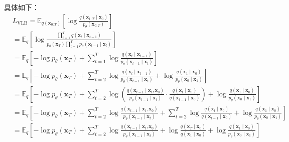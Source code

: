 具体如下：
\begin{equation}
\begin{aligned}
& L_{\mathrm{VLB}}=\mathbb{E}_{q\left(\mathbf{x}_{0: T}\right)}\left[\log \frac{q\left(\mathbf{x}_{1: T} \mid \mathbf{x}_0\right)}{p_\theta\left(\mathbf{x}_{0: T}\right)}\right] \\
& =\mathbb{E}_q\left[\log \frac{\prod_{t=1}^T q\left(\mathbf{x}_t \mid \mathbf{x}_{t-1}\right)}{p_\theta\left(\mathbf{x}_T\right) \prod_{t=1}^T p_\theta\left(\mathbf{x}_{t-1} \mid \mathbf{x}_t\right)}\right] \\
& =\mathbb{E}_q\left[-\log p_\theta\left(\mathbf{x}_T\right)+\sum_{t=1}^T \log \frac{q\left(\mathbf{x}_t \mid \mathbf{x}_{t-1}\right)}{p_\theta\left(\mathbf{x}_{t-1} \mid \mathbf{x}_t\right)}\right] \\
& =\mathbb{E}_q\left[-\log p_\theta\left(\mathbf{x}_T\right)+\sum_{t=2}^T \log \frac{q\left(\mathbf{x}_t \mid \mathbf{x}_{t-1}\right)}{p_\theta\left(\mathbf{x}_{t-1} \mid \mathbf{x}_t\right)}+\log \frac{q\left(\mathbf{x}_1 \mid \mathbf{x}_0\right)}{p_\theta\left(\mathbf{x}_0 \mid \mathbf{x}_1\right)}\right] \\
& =\mathbb{E}_q\left[-\log p_\theta\left(\mathbf{x}_T\right)+\sum_{t=2}^T \log \left(\frac{q\left(\mathbf{x}_{t-1} \mid \mathbf{x}_t, \mathbf{x}_0\right)}{p_\theta\left(\mathbf{x}_{t-1} \mid \mathbf{x}_t\right)} \cdot \frac{q\left(\mathbf{x}_t \mid \mathbf{x}_0\right)}{q\left(\mathbf{x}_{t-1} \mid \mathbf{x}_0\right)}\right)+\log \frac{q\left(\mathbf{x}_1 \mid \mathbf{x}_0\right)}{p_\theta\left(\mathbf{x}_0 \mid \mathbf{x}_1\right)}\right] \\
& =\mathbb{E}_q\left[-\log p_\theta\left(\mathbf{x}_T\right)+\sum_{t=2}^T \log \frac{q\left(\mathbf{x}_{t-1} \mid \mathbf{x}_t, \mathbf{x}_0\right)}{p_\theta\left(\mathbf{x}_{t-1} \mid \mathbf{x}_t\right)}+\sum_{t=2}^T \log \frac{q\left(\mathbf{x}_t \mid \mathbf{x}_0\right)}{q\left(\mathbf{x}_{t-1} \mid \mathbf{x}_0\right)}+\log \frac{q\left(\mathbf{x}_1 \mid \mathbf{x}_0\right)}{p_\theta\left(\mathbf{x}_0 \mid \mathbf{x}_1\right)}\right] \\
& =\mathbb{E}_q\left[-\log p_\theta\left(\mathbf{x}_T\right)+\sum_{t=2}^T \log \frac{q\left(\mathbf{x}_{t-1} \mid \mathbf{x}_t, \mathbf{x}_0\right)}{p_\theta\left(\mathbf{x}_{t-1} \mid \mathbf{x}_t\right)}+\log \frac{q\left(\mathbf{x}_T \mid \mathbf{x}_0\right)}{q\left(\mathbf{x}_1 \mid \mathbf{x}_0\right)}+\log \frac{q\left(\mathbf{x}_1 \mid \mathbf{x}_0\right)}{p_\theta\left(\mathbf{x}_0 \mid \mathbf{x}_1\right)}\right] \\

\end{aligned}
\end{equation}
